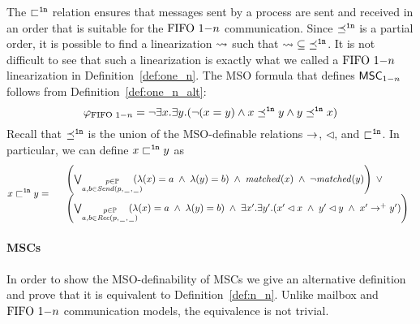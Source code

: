 The ${\sqsubset^{\mathtt{1n}}}$ relation ensures that messages sent by a process are sent and received in an order that is suitable for the $\text{FIFO } 1\mathsf{-}n$ communication. Since ${\preceq^{\mathtt{1n}}}$ is a partial order, it is possible to find a linearization $\rightsquigarrow$ such that $\rightsquigarrow \;\subseteq\; \preceq^{\mathtt{1n}}$. It is not difficult to see that such a linearization is exactly what we called a $\text{FIFO } 1\mathsf{-}n$ linearization in Definition~\ref{def:one_n}.
The MSO formula that defines $\mathsf{MSC}_{1\mathsf{-}n}$ follows from  Definition~\ref{def:one_n_alt}:
\[
	\varphi_{\text{FIFO } 1\mathsf{-}n} = \neg \exists x.\exists y.(\neg (x = y) \wedge x \preceq^{\mathtt{1n}} y \wedge y \preceq^{\mathtt{1n}} x)
\]
Recall that $\preceq^{\mathtt{1n}}$ is the union of the MSO-definable relations $\to$, $\lhd$, and $\sqsubset^{\mathtt{1n}}$. In particular, we can define $x \sqsubset^{\mathtt{1n}} y$ as
\[
x \sqsubset^{\mathtt{1n}} y =
\begin{array}{rl}
& \left(
	\bigvee_{\substack{p \in \mathbb{P}\\a,b \in {\mathit{Send}(p,\hspace{0.1em}\underline{\hspace{0.5em}}\hspace{0.1em},\hspace{0.1em}\underline{\hspace{0.5em}}\hspace{0.1em})}}}\hspace{-1em}
	(\lambda(x) = a \;\wedge\; \lambda(y) = b)
	\;\wedge\; \mathit{matched}(x) \;\wedge\; \neg \mathit{matched}(y)
\right) \;\vee\\
& \left(
	\bigvee_{\substack{p \in \mathbb{P}\\a,b \in {\mathit{Rec}(p,\hspace{0.1em}\underline{\hspace{0.5em}}\hspace{0.1em},\hspace{0.1em}\underline{\hspace{0.5em}}\hspace{0.1em})}}}\hspace{-1em}
	(\lambda(x) = a \;\wedge\; \lambda(y) = b)
	\;\wedge\;
	\exists x'.\exists y'. (x' \lhd x \;\wedge\; y' \lhd y \;\wedge\; x' \to^+ y')
\right)\\
\end{array}
\]


\paragraph{\bf \nn MSCs}

In order to show the MSO-definability of \nn MSCs we give an alternative definition and prove that it is equivalent to Definition~\ref{def:n_n}. Unlike mailbox and $\text{FIFO } 1\mathsf{-}n$ communication models, the equivalence is not trivial.

